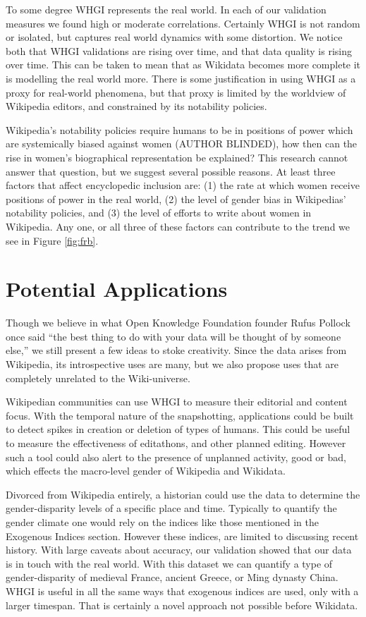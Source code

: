 \documentclass[letterpaper]{article}
\begin{document}
To some degree WHGI represents the real world. In each of our validation measures we found high or moderate correlations. Certainly WHGI is not random or isolated, but captures real world dynamics with some distortion. We notice both that WHGI validations are rising over time, and that data quality is rising over time. This can be taken to mean that as Wikidata becomes more complete it is modelling the real world more. There is some justification in using WHGI as a proxy for real-world phenomena, but that proxy is limited by the worldview of Wikipedia editors, and constrained by its notability policies. 

Wikipedia's notability policies require humans to be in positions of power which are systemically biased against women (AUTHOR BLINDED), how then can the rise in women's biographical representation be explained? This research cannot answer that question, but we suggest several possible reasons. At least three factors that affect encyclopedic inclusion are: (1) the rate at which women receive positions of power in the real world, (2) the level of gender bias in Wikipedias' notability policies, and (3) the level of efforts to write about women in Wikipedia. Any one, or all three of these factors can contribute to the trend we see in Figure \ref{fig:frb}.

\section{Potential Applications}
Though we believe in what Open Knowledge Foundation founder Rufus Pollock once said ``the best thing to do with your data will be thought of by someone else,'' we still present a few ideas to stoke creativity. Since the data arises from Wikipedia, its introspective uses are many, but we also propose uses that are completely unrelated to the Wiki-universe. 

Wikipedian communities can use WHGI to measure their editorial and content focus. With the temporal nature of the snapshotting, applications could be built to detect spikes in creation or deletion of types of humans. This could be useful to measure the effectiveness of editathons, and other planned editing. However such a tool could also alert to the presence of unplanned activity, good or bad, which effects the macro-level gender of Wikipedia and Wikidata.

Divorced from Wikipedia entirely, a historian could use the data to determine the gender-disparity levels of a specific place and time. Typically to quantify the gender climate one would rely on the indices like those mentioned in the Exogenous Indices section. However these indices, are limited to discussing recent history. With large caveats about accuracy, our validation showed that our data is in touch with the real world. With this dataset we can quantify a type of gender-disparity of medieval France, ancient Greece, or Ming dynasty China. WHGI is useful in all the same ways that exogenous indices are used, only with a larger timespan. That is certainly a novel approach not possible before Wikidata.
\end{document}
